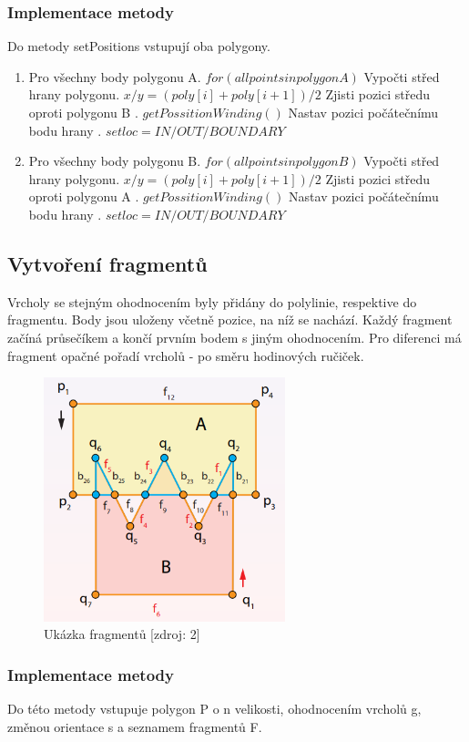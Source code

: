 \documentclass[a4paper, 12pt]{article}
\begin{document}
\subsubsection{Implementace metody}
Do metody setPositions vstupují oba polygony.

\begin{enumerate}
\item Pro všechny body polygonu A. $ for( all points in polygon A ) $
\subitem Vypočti střed hrany polygonu. $ x/y = (poly[i] + poly[i+1])/2 $
\subitem Zjisti pozici středu oproti polygonu B . $ getPossitionWinding() $
\subitem Nastav pozici počátečnímu bodu hrany . $ set loc = IN/OUT/BOUNDARY $
\item Pro všechny body polygonu B. $ for( all points in polygon B ) $
\subitem Vypočti střed hrany polygonu. $ x/y = (poly[i] + poly[i+1])/2 $
\subitem Zjisti pozici středu oproti polygonu A . $ getPossitionWinding() $
\subitem Nastav pozici počátečnímu bodu hrany . $ set loc = IN/OUT/BOUNDARY $
\end{enumerate}


\subsection{Vytvoření fragmentů}
Vrcholy se stejným ohodnocením byly přidány do polylinie, respektive do fragmentu. Body jsou uloženy včetně pozice, na níž se nachází. Každý fragment začíná průsečíkem a končí prvním bodem s jiným ohodnocením. Pro diferenci má fragment opačné pořadí vrcholů - po směru hodinových ručiček. 

\begin{figure}[h!]
	\centering
	\includegraphics[width=7cm]{pictures/fragmenty.png}
	\caption{Ukázka fragmentů [zdroj: 2]}
\end{figure}


\subsubsection{Implementace metody}
Do této metody vstupuje polygon P o n velikosti, ohodnocením vrcholů g, změnou orientace s a seznamem fragmentů F. 
\end{document}

